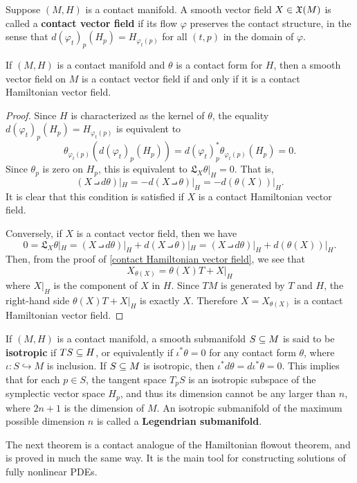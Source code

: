 Suppose $(M,H)$ is a contact manifold. A smooth vector field $X\in\mathfrak{X}(M)$ is
called a \textbf{contact vector field} if its flow $\varphi$ preserves the contact structure, in the sense that $d(\varphi_t)_p(H_p)=H_{\varphi_t(p)}$ for all $(t,p)$ in the domain of $\varphi$.
\begin{theorem}
If $(M,H)$ is a contact manifold and $\theta$ is a contact form for $H$, then a smooth vector field on $M$ is a contact vector field if and only if it is a contact Hamiltonian vector field.
\end{theorem}
\begin{proof}
Since $H$ is characterized as the kernel of $\theta$, the equality $d(\varphi_t)_p(H_p)=H_{\varphi_t(p)}$ is equivalent to
\[\theta_{\varphi_t(p)}(d(\varphi_t)_p(H_p))=d(\varphi_t)_p^*\theta_{\varphi_t(p)}(H_p)=0.\]
Since $\theta_p$ is zero on $H_p$, this is equivalent to $\mathfrak{L}_{X}\theta|_H=0$. That is,
\[(X\intprod d\theta)|_H=-d(X\intprod\theta)|_H=-d(\theta(X))|_H.\]
It is clear that this condition is satisfied if $X$ is a contact Hamiltonian vector field.\par
Conversely, if $X$ is a contact vector field, then we have
\[0=\mathfrak{L}_X\theta|_H=(X\intprod d\theta)|_H+d(X\intprod\theta)|_H=(X\intprod d\theta)|_H+d(\theta(X))|_H.\]
Then, from the proof of \cref{contact Hamiltonian vector field}, we see that 
\[X_{\theta(X)}=\theta(X)T+X|_H\]
where $X|_H$ is the component of $X$ in $H$. Since $TM$ is generated by $T$ and $H$, the right-hand side $\theta(X)T+X|_H$ is exactly $X$. Therefore $X=X_{\theta(X)}$ is a contact Hamiltonian vector field.
\end{proof}

If $(M,H)$ is a contact manifold, a smooth submanifold $S\subseteq M$ is said to be \textbf{isotropic} if $TS\subseteq H$, or equivalently if $\iota^*\theta=0$ for any contact form $\theta$, where $\iota:S\hookrightarrow M$ is inclusion. If $S\subseteq M$ is isotropic, then $\iota^*d\theta=d\iota^*\theta=0$. This implies that for each $p\in S$, the tangent space $T_pS$ is an isotropic subspace of the symplectic vector space $H_p$, and thus its dimension cannot be any larger than $n$, where $2n+1$ is the dimension of $M$. An isotropic submanifold of the maximum possible dimension $n$ is called a \textbf{Legendrian submanifold}.\par
The next theorem is a contact analogue of the Hamiltonian flowout theorem, and is proved in much the same way. It is the main tool for constructing solutions of fully nonlinear PDEs.

